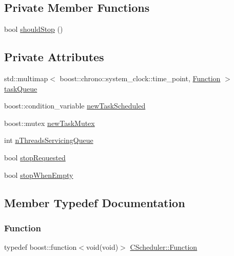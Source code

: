 \subsection*{Private Member Functions}
\begin{DoxyCompactItemize}
\item 
bool \mbox{\hyperlink{class_c_scheduler_a66e40dd7a6eef503c255bba54168df95}{should\+Stop}} ()
\end{DoxyCompactItemize}
\subsection*{Private Attributes}
\begin{DoxyCompactItemize}
\item 
std\+::multimap$<$ boost\+::chrono\+::system\+\_\+clock\+::time\+\_\+point, \mbox{\hyperlink{class_c_scheduler_af0202f526eeef71defb156dc06f70279}{Function}} $>$ \mbox{\hyperlink{class_c_scheduler_a206a499765bd27e5aaff4c4ba2255f91}{task\+Queue}}
\item 
boost\+::condition\+\_\+variable \mbox{\hyperlink{class_c_scheduler_a9aff0df5c40338dd9ed01334aae05cdf}{new\+Task\+Scheduled}}
\item 
boost\+::mutex \mbox{\hyperlink{class_c_scheduler_a6b161d2bf167c00285522b088a05bfa6}{new\+Task\+Mutex}}
\item 
int \mbox{\hyperlink{class_c_scheduler_aa0fc35cbc38efb37a9b5b8756d869875}{n\+Threads\+Servicing\+Queue}}
\item 
bool \mbox{\hyperlink{class_c_scheduler_a8609cd421d5d416708a22aea138dd882}{stop\+Requested}}
\item 
bool \mbox{\hyperlink{class_c_scheduler_a78e214ee8c89bfc8083cb95261ebbc6f}{stop\+When\+Empty}}
\end{DoxyCompactItemize}


\subsection{Member Typedef Documentation}
\mbox{\label{class_c_scheduler_af0202f526eeef71defb156dc06f70279}} 
\subsubsection{\texorpdfstring{Function}{Function}}
{\footnotesize\ttfamily typedef boost\+::function$<$void(void)$>$ \mbox{\hyperlink{class_c_scheduler_af0202f526eeef71defb156dc06f70279}{C\+Scheduler\+::\+Function}}}



